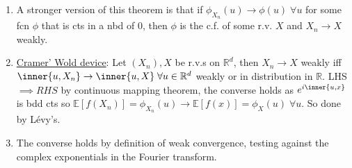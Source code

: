 \begin{remark}
	\begin{enumerate}
		\item A stronger version of this theorem is that if $\phi_{X_n}(u) \to \phi(u) \; \forall u$ for some fcn $\phi$ that is cts in a nbd of $0$, then $\phi$ is the c.f. of some r.v. $X$ and $X_n \to X$ weakly.
		\item \underline{Cramer' Wold device}: Let $(X_n), X$ be r.v.s on $\mathbb{R}^d$, then $X_n \to X$ weakly iff $\inner{u, X_n} \to \inner{u, X} \; \forall u \in \mathbb{R}^d$ weakly or in distribution in $\mathbb{R}$. LHS $\implies RHS$ by continuous mapping theorem, the converse holds as $e^{i \inner{u, x}}$ is bdd cts so $\mathbb{E}[f(X_n)] = \phi_{X_n}(u) \to \mathbb{E}[f(x)] = \phi_X(u) \; \forall u$. So done by L\'evy's.
		\item The converse holds by definition of weak convergence, testing against the complex exponentials in the Fourier transform.
	\end{enumerate}
\end{remark}

